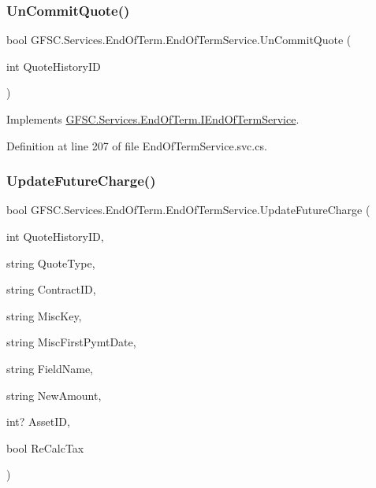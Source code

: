 \subsubsection{\texorpdfstring{Un\+Commit\+Quote()}{UnCommitQuote()}}
{\footnotesize\ttfamily bool G\+F\+S\+C.\+Services.\+End\+Of\+Term.\+End\+Of\+Term\+Service.\+Un\+Commit\+Quote (\begin{DoxyParamCaption}\item[{int}]{Quote\+History\+ID }\end{DoxyParamCaption})}



Implements \mbox{\hyperlink{interface_g_f_s_c_1_1_services_1_1_end_of_term_1_1_i_end_of_term_service_acd3f4ada554c2fa73b6e9eeaf4d73d69}{G\+F\+S\+C.\+Services.\+End\+Of\+Term.\+I\+End\+Of\+Term\+Service}}.



Definition at line 207 of file End\+Of\+Term\+Service.\+svc.\+cs.

\mbox{\label{class_g_f_s_c_1_1_services_1_1_end_of_term_1_1_end_of_term_service_a92d301736a442fc1a6ca7e8286886b66}} 
\subsubsection{\texorpdfstring{Update\+Future\+Charge()}{UpdateFutureCharge()}}
{\footnotesize\ttfamily bool G\+F\+S\+C.\+Services.\+End\+Of\+Term.\+End\+Of\+Term\+Service.\+Update\+Future\+Charge (\begin{DoxyParamCaption}\item[{int}]{Quote\+History\+ID,  }\item[{string}]{Quote\+Type,  }\item[{string}]{Contract\+ID,  }\item[{string}]{Misc\+Key,  }\item[{string}]{Misc\+First\+Pymt\+Date,  }\item[{string}]{Field\+Name,  }\item[{string}]{New\+Amount,  }\item[{int?}]{Asset\+ID,  }\item[{bool}]{Re\+Calc\+Tax }\end{DoxyParamCaption})}




